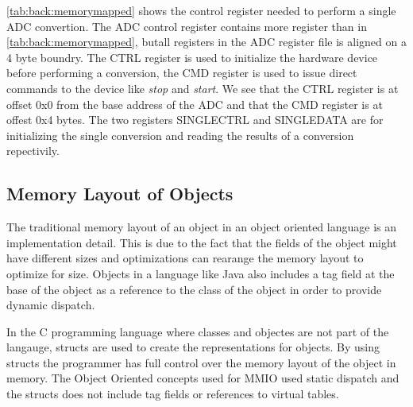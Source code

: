 \autoref{tab:back:memorymapped} shows the control register needed to perform a single ADC convertion.
The ADC control register contains more register than in \autoref{tab:back:memorymapped}, butall registers in the ADC register file is aligned on a 4 byte boundry.
The CTRL register is used to initialize the hardware device before performing a conversion, the CMD register is used to issue direct commands to the device like \emph{stop} and \emph{start}.
We see that the CTRL register is at offset 0x0 from the base address of the ADC and that the CMD register is at offest 0x4 bytes.
The two registers SINGLECTRL and SINGLEDATA are for initializing the single conversion and reading the results of a conversion repectivily.

\subsection{Memory Layout of Objects}

The traditional memory layout of an object in an object oriented language is an implementation detail.
This is due to the fact that the fields of the object might have different sizes and optimizations can rearange the memory layout to optimize for size.
Objects in a language like Java also includes a tag field at the base of the object as a reference to the class of the object in order to provide dynamic dispatch.

In the C programming language where classes and objectes are not part of the langauge, structs are used to create the representations for objects.
By using structs the programmer has full control over the memory layout of the object in memory.
The Object Oriented concepts used for MMIO used static dispatch and the structs does not include tag fields or references to virtual tables.

